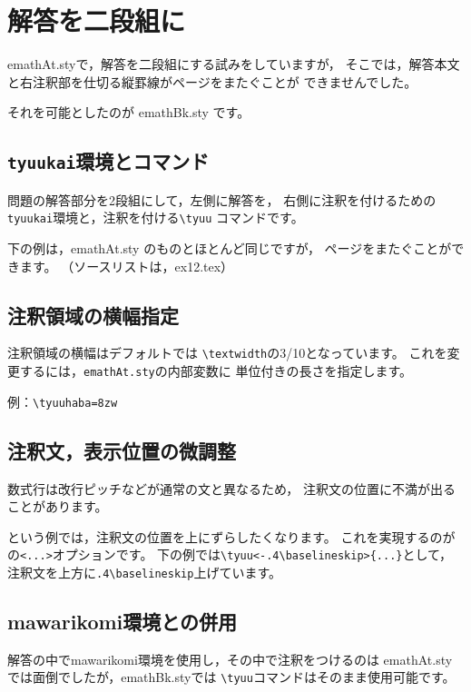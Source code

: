 \documentclass[a4j,fleqn]{jarticle}
\begin{document}
\section{解答を二段組に}
\textsf{emathAt.sty}で，解答を二段組にする試みをしていますが，
そこでは，解答本文と右注釈部を仕切る縦罫線がページをまたぐことが
できませんでした。

それを可能としたのが \textsf{emathBk.sty} です。

\subsection{\texttt{tyuukai}環境とコマンド}
問題の解答部分を2段組にして，左側に解答を，
右側に注釈を付けるための \verb+tyuukai+環境と，注釈を付ける\verb+\tyuu+
コマンドです。

下の例は，\textsf{emathAt.sty} のものとほとんど同じですが，
ページをまたぐことができます。
（ソースリストは，ex12.tex）



\subsection{注釈領域の横幅指定}
注釈領域の横幅はデフォルトでは \verb+\textwidth+の3/10となっています。
これを変更するには，\verb+emathAt.sty+の内部変数に
単位付きの長さを指定します。
\begin{jquote}
 例：\verb+\tyuuhaba=8zw+
\end{jquote}

{}

\clearpage

\subsection{注釈文，表示位置の微調整}
数式行は改行ピッチなどが通常の文と異なるため，
注釈文の位置に不満が出ることがあります。



という例では，注釈文の位置を上にずらしたくなります。
これを実現するのがの\verb+<...>+オプションです。
下の例では\verb+\tyuu<-.4\baselineskip>{...}+として，
注釈文を上方に\verb+.4\baselineskip+上げています。


\clearpage

\subsection{\textsf{mawarikomi}環境との併用}
解答の中で\textsf{mawarikomi}環境を使用し，その中で注釈をつけるのは
\textsf{emathAt.sty}では面倒でしたが，\textsf{emathBk.sty}では
\verb+\tyuu+コマンドはそのまま使用可能です。
\end{document}
